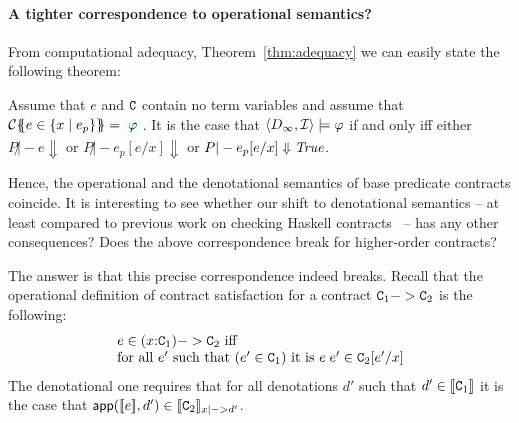 
\paragraph{A tighter correspondence to operational semantics?}

From computational adequacy, Theorem~\ref{thm:adequacy} we can easily state
the following theorem: 
\begin{corollary} Assume that $e$ and $\Ct$ contain no term variables and 
assume that $\ctrans{}{\cdot}{e \in \{x \mid e_p\}} = \formula{\phi}$. It is the case 
that $\langle D_\infty,{\cal I}\rangle \models \phi$ if and only iff either
$P \not|- e \Downarrow$ or $P \not|- e_p[e/x] \Downarrow$ or $P |- e_p[e/x] \Downarrow \True$. \end{corollary}

Hence, the operational and the denotational semantics of base predicate contracts coincide.
It is interesting to see whether our shift to denotational semantics -- at least compared
to previous work on checking Haskell contracts~\cite{xu+:contracts} -- has any other consequences? 
Does the above correspondence break for higher-order contracts?

The answer is that this precise correspondence indeed breaks. 
Recall that the operational definition of contract satisfaction for a contract $\Ct_1 -> \Ct_2$ is the following: 
\[\begin{array}{l} 
   e \in (x{:}\Ct_1) -> \Ct_2 \text{ iff} \\
   \text{for all } e' \text{ such that } (e' \in \Ct_1) \text{ it is } e\;e' \in \Ct_2[e'/x]
\end{array}\] 
The denotational one requires that for all denotations $d'$ such that
$d' \in \dbrace{\Ct_1}$ it is the case that 
$\dapp(\dbrace{e},d') \in \dbrace{\Ct_2}_{x |->d'}$. 
 
